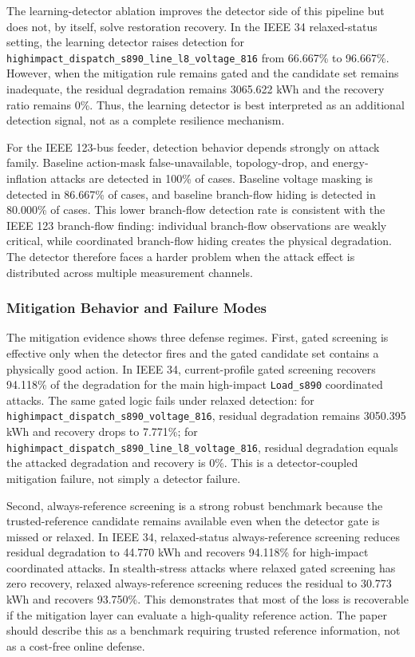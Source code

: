 The learning-detector ablation improves the detector side of this pipeline but does not, by itself, solve restoration recovery. In the IEEE 34 relaxed-status setting, the learning detector raises detection for \texttt{highimpact\_dispatch\_s890\_line\_l8\_voltage\_816} from 66.667\% to 96.667\%. However, when the mitigation rule remains gated and the candidate set remains inadequate, the residual degradation remains 3065.622 kWh and the recovery ratio remains 0\%. Thus, the learning detector is best interpreted as an additional detection signal, not as a complete resilience mechanism.

For the IEEE 123-bus feeder, detection behavior depends strongly on attack family. Baseline action-mask false-unavailable, topology-drop, and energy-inflation attacks are detected in 100\% of cases. Baseline voltage masking is detected in 86.667\% of cases, and baseline branch-flow hiding is detected in 80.000\% of cases. This lower branch-flow detection rate is consistent with the IEEE 123 branch-flow finding: individual branch-flow observations are weakly critical, while coordinated branch-flow hiding creates the physical degradation. The detector therefore faces a harder problem when the attack effect is distributed across multiple measurement channels.

\subsubsection{Mitigation Behavior and Failure Modes}
\label{subsubsec:mitigation_behavior}

The mitigation evidence shows three defense regimes. First, gated screening is effective only when the detector fires and the gated candidate set contains a physically good action. In IEEE 34, current-profile gated screening recovers 94.118\% of the degradation for the main high-impact \texttt{Load\_s890} coordinated attacks. The same gated logic fails under relaxed detection: for \texttt{highimpact\_dispatch\_s890\_voltage\_816}, residual degradation remains 3050.395 kWh and recovery drops to 7.771\%; for \texttt{highimpact\_dispatch\_s890\_line\_l8\_voltage\_816}, residual degradation equals the attacked degradation and recovery is 0\%. This is a detector-coupled mitigation failure, not simply a detector failure.

Second, always-reference screening is a strong robust benchmark because the trusted-reference candidate remains available even when the detector gate is missed or relaxed. In IEEE 34, relaxed-status always-reference screening reduces residual degradation to 44.770 kWh and recovers 94.118\% for high-impact coordinated attacks. In stealth-stress attacks where relaxed gated screening has zero recovery, relaxed always-reference screening reduces the residual to 30.773 kWh and recovers 93.750\%. This demonstrates that most of the loss is recoverable if the mitigation layer can evaluate a high-quality reference action. The paper should describe this as a benchmark requiring trusted reference information, not as a cost-free online defense.

